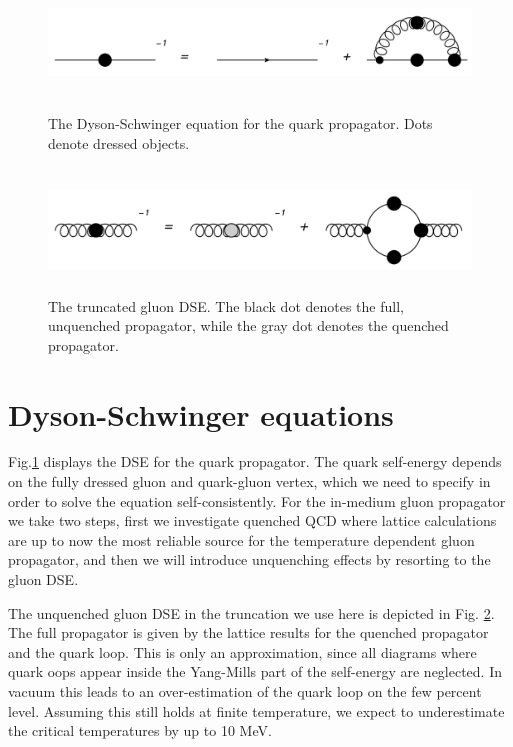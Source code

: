 \documentclass[a4paper,fleqn]{cls/cas-dc}
\begin{document}
	\begin{figure}
	\centering
	\includegraphics[width=\textwidth,height=1.4in]{fig/fig1.png}
	\caption{The Dyson-Schwinger equation for the quark propagator. Dots denote dressed objects.}
	\label{FIG:1}
\end{figure}
\begin{figure}
	\centering
	\includegraphics[width=\textwidth,height=1.3in]{fig/fig2.png}
	\caption{The truncated gluon DSE. The black dot denotes the full, unquenched propagator, while the gray dot denotes the quenched propagator.}
	\label{FIG:2}
\end{figure}
\section{Dyson-Schwinger equations}
Fig.\ref{FIG:1} displays the DSE for the quark propagator. The quark self-energy depends on the fully dressed gluon and quark-gluon vertex, which we need to specify in order to solve the equation self-consistently. For the in-medium gluon
propagator we take two steps, first we investigate quenched QCD where lattice calculations are up to now the most reliable
source for the temperature dependent gluon propagator, and then we will introduce unquenching effects by resorting to
the gluon DSE.

The unquenched gluon DSE in the truncation we use here is depicted in Fig. \ref{FIG:2}. The full propagator is given by the lattice
results for the quenched propagator and the quark loop. This is only an approximation, since all diagrams where quark
oops appear inside the Yang-Mills part of the self-energy are neglected. In vacuum this leads to an over-estimation of the
quark loop on the few percent level. Assuming this still holds at finite temperature, we expect to underestimate the critical
temperatures by up to 10 MeV.
\end{document}
